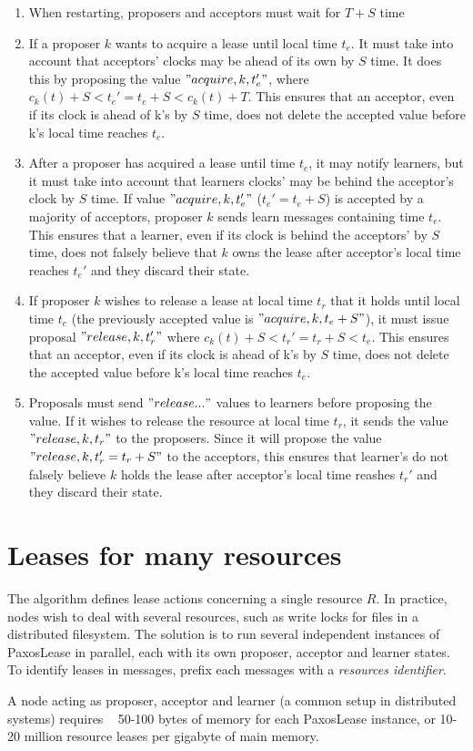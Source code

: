 \documentclass[12pt]{article}
\begin{document}
\begin{enumerate}

\item When restarting, proposers and acceptors must wait for $T + S$ time

\item If a proposer $k$ wants to acquire a lease until local time $t_e$. It must take into account that acceptors' clocks may be ahead of its own by $S$ time. It does this by proposing the value $"acquire, k, t_e'"$, where $c_k(t) + S < t_e' = t_e + S < c_k(t) + T$. This ensures that an acceptor, even if its clock is ahead of k's by $S$ time, does not delete the accepted value before k's local time reaches $t_e$.
 
\item After a proposer has acquired a lease until time $t_e$, it may notify learners, but it must take into account that learners clocks' may be behind the acceptor's clock by $S$ time. If value $"acquire, k, t_e'"$ ($t_e' = t_e + S$) is accepted by a majority of acceptors, proposer $k$ sends learn messages containing time $t_e$. This ensures that a learner, even if its clock is behind the acceptors' by $S$ time, does not falsely believe that $k$ owns the lease after acceptor's local time reaches $t_e'$ and they discard their state.

\item If proposer $k$ wishes to release a lease at local time $t_r$ that it holds until local time $t_e$ (the previously accepted value is $"acquire, k, t_e + S"$), it must issue proposal $"release, k, t_r'"$ where $c_k(t) + S < t_r' = t_r + S < t_e$. This ensures that an acceptor, even if its clock is ahead of k's by $S$ time, does not delete the accepted value before k's local time reaches $t_e$.

\item Proposals must send $"release..."$ values to learners before proposing the value. If it wishes to release the resource at local time $t_r$, it sends the value $"release, k, t_r"$ to the proposers. Since it will propose the value $"release, k, t_r' = t_r + S"$ to the acceptors, this ensures that learner's do not falsely believe $k$ holds the lease after acceptor's local time reashes $t_r'$ and they discard their state.

\end{enumerate}


\section{ Leases for many resources }

The algorithm defines lease actions concerning a single resource $R$. In practice, nodes wish to deal with several resources, such as write locks for files in a distributed filesystem. The solution is to run several independent instances of PaxosLease in parallel, each with its own proposer, acceptor and learner states. To identify leases in messages, prefix each messages with a \emph{resources identifier}.

A node acting as proposer, acceptor and learner (a common setup in distributed systems) requires ~ 50-100 bytes of memory for each PaxosLease instance, or 10-20 million resource leases per gigabyte of main memory.
\end{document}
